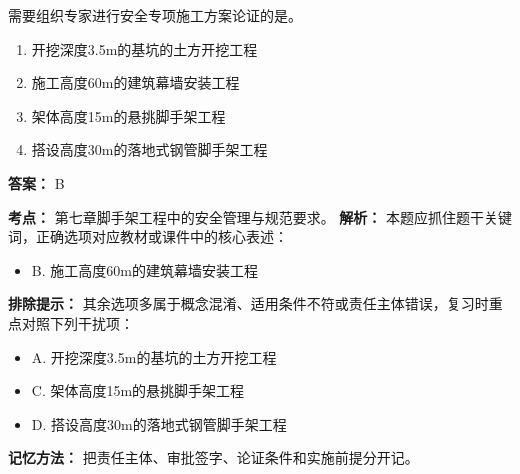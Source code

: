 \documentclass[UTF8,fontset=fandol,11pt]{ctexart}
\begin{document}
\begin{quizbox}[title={第 9 题}]
需要组织专家进行安全专项施工方案论证的是。\\
\begin{enumerate}[label=\Alph*.]
\item 开挖深度3.5m的基坑的土方开挖工程
\item 施工高度60m的建筑幕墙安装工程
\item 架体高度15m的悬挑脚手架工程
\item 搭设高度30m的落地式钢管脚手架工程
\end{enumerate}
\textbf{答案：} B
\vspace{0.25em}
\begin{answerbox}[title={考点解析}]
\textbf{考点：} 第七章脚手架工程中的安全管理与规范要求。
\textbf{解析：} 本题应抓住题干关键词，正确选项对应教材或课件中的核心表述：
\begin{itemize}
\item B. 施工高度60m的建筑幕墙安装工程
\end{itemize}
\textbf{排除提示：} 其余选项多属于概念混淆、适用条件不符或责任主体错误，复习时重点对照下列干扰项：
\begin{itemize}
\item A. 开挖深度3.5m的基坑的土方开挖工程
\item C. 架体高度15m的悬挑脚手架工程
\item D. 搭设高度30m的落地式钢管脚手架工程
\end{itemize}
\textbf{记忆方法：} 把责任主体、审批签字、论证条件和实施前提分开记。
\end{answerbox}
\end{quizbox}

\vspace{0.2em}
\end{document}

